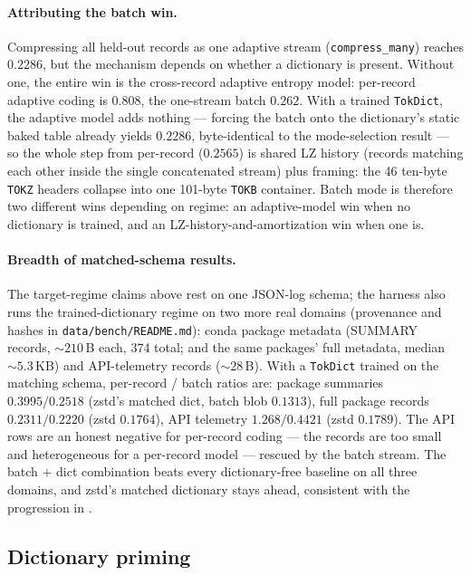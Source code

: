 \documentclass[10pt,twocolumn]{article}
\theoremstyle{plain}
\theoremstyle{definition}
\begin{document}
\paragraph{Attributing the batch win.} Compressing all held-out records as one
adaptive stream (\texttt{compress\_many}) reaches $0.2286$, but the mechanism
depends on whether a dictionary is present. Without one, the entire win is the
cross-record adaptive entropy model: per-record adaptive coding is $0.808$, the
one-stream batch $0.262$. With a trained \texttt{TokDict}, the adaptive model
adds nothing --- forcing the batch onto the dictionary's static baked table
already yields $0.2286$, byte-identical to the mode-selection result --- so the
whole step from per-record ($0.2565$) is shared LZ history (records matching
each other inside the single concatenated stream) plus framing: the 46
ten-byte \texttt{TOKZ} headers collapse into one 101-byte \texttt{TOKB}
container. Batch mode is therefore two different wins depending on regime: an
adaptive-model win when no dictionary is trained, and an
LZ-history-and-amortization win when one is.

\paragraph{Breadth of matched-schema results.} The target-regime claims above
rest on one JSON-log schema; the harness also runs the trained-dictionary
regime on two more real domains (provenance and hashes in
\texttt{data/bench/README.md}): conda package metadata (SUMMARY records,
$\sim\!210$\,B each, 374 total; and the same packages' full metadata, median
$\sim\!5.3$\,KB) and API-telemetry records ($\sim\!28$\,B). With a
\texttt{TokDict} trained on the matching schema, per-record / batch ratios are:
package summaries $0.3995 / 0.2518$ (zstd's matched dict, batch blob $0.1313$),
full package records $0.2311 / 0.2220$ (zstd $0.1764$), API telemetry
$1.268 / 0.4421$ (zstd $0.1789$). The API rows are an honest negative for
per-record coding --- the records are too small and heterogeneous for a
per-record model --- rescued by the batch stream. The batch $+$ dict
combination beats every dictionary-free baseline on all three domains, and
zstd's matched dictionary stays ahead, consistent with the progression in
.

\subsection{Dictionary priming}\label{sec:dict}
\end{document}
